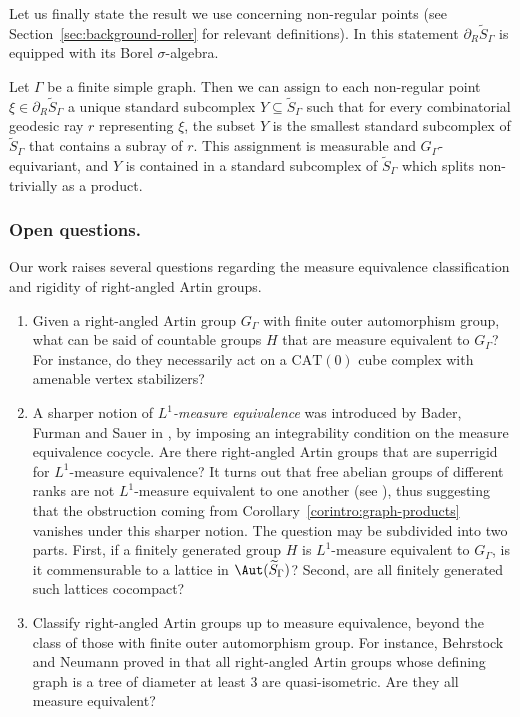 Let us finally state the result we use concerning non-regular points (see Section~\ref{sec:background-roller} for relevant definitions). In this statement $\partial_R\widetilde{S}_\Gamma$ is equipped with its Borel $\sigma$-algebra.

\begin{theointro}\label{theointro:roller}
Let $\Gamma$ be a finite simple graph. Then we can assign to each non-regular point $\xi\in\partial_R\widetilde{S}_\Gamma$ a unique standard subcomplex $Y\subseteq\widetilde{S}_\Gamma$ such that for every combinatorial geodesic ray $r$ representing $\xi$, the subset $Y$ is the smallest standard subcomplex of $\widetilde{S}_\Gamma$ that contains a subray of $r$. This assignment is measurable and $G_\Gamma$-equivariant, and $Y$ is contained in a standard subcomplex of $\widetilde{S}_\Gamma$ which splits non-trivially as a product.
\end{theointro}

\subsubsection*{Open questions.} Our work raises several questions regarding the measure equivalence classification and rigidity of right-angled Artin groups.
\begin{enumerate}
\item Given a right-angled Artin group $G_\Gamma$ with finite outer automorphism group, what can be said of countable groups $H$ that are measure equivalent to $G_\Gamma$? For instance, do they necessarily act on a $\mathrm{CAT}(0)$ cube complex with amenable vertex stabilizers?
\item A sharper notion of \emph{$L^1$-measure equivalence} was introduced by Bader, Furman and Sauer in \cite{BFS}, by imposing an integrability condition on the measure equivalence cocycle. Are there right-angled Artin groups that are superrigid for $L^1$-measure equivalence? It turns out that free abelian groups of different ranks are not $L^1$-measure equivalent to one another (see \cite{Aus}), thus suggesting that the obstruction coming from Corollary~\ref{corintro:graph-products} vanishes under this sharper notion. The question may be subdivided into two parts. First, if a finitely generated group $H$ is $L^1$-measure equivalent to $G_\Gamma$, is it commensurable to a lattice in $\Aut(\widetilde{S}_\Gamma)$? Second, are all finitely generated such lattices cocompact?
\item Classify right-angled Artin groups up to measure equivalence, beyond the class of those with finite outer automorphism group. For instance, Behrstock and Neumann proved in \cite{behrstock2008quasi} that all right-angled Artin groups whose defining graph is a tree of diameter at least $3$ are quasi-isometric. Are they all measure equivalent?
\end{enumerate}

